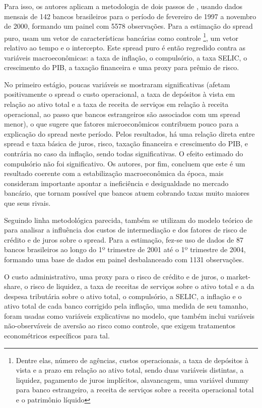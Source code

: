 \documentclass[a4paper, 12pt, openany, oneside, brazil]{abntex2}
\begin{document}
    Para isso, os autores aplicam a metodologia de dois passos de
    , usando dados mensais de 142 bancos brasileiros
    para o período de fevereiro de 1997 a novembro de 2000, formando um painel
    com 5578 observações. Para a estimação do spread puro, usam um vetor de
    características bancárias como controle \footnote{Dentre elas, número de
        agências, custos operacionais, a taxa de depósitos à vista e a prazo em
        relação ao ativo total, sendo duas variáveis distintas, a liquidez,
        pagamento de juros implícitos, alavancagem, uma variável dummy para banco
        estrangeiro, a receita de serviços sobre a receita operacional total e o
    patrimônio líquido}, um vetor relativo ao tempo e o intercepto. Este spread
    puro é então regredido contra as variáveis macroeconômicas: a taxa de
    inflação, o compulsório, a taxa SELIC, o crescimento do PIB, a taxação
    financeira e uma proxy para prêmio de risco.

    No primeiro estágio, poucas variáveis se mostraram significativas (afetam
    positivamente o spread o custo operacional, a taxa de depósitos à vista em
    relação ao ativo total e a taxa de receita de serviços em relação à receita
    operacional, ao passo que bancos estrangeiros são associados com um spread
    menor), o que sugere que fatores microeconômicos contribuem pouco para a
    explicação do spread neste período. Pelos resultados, há uma relação direta
    entre spread e taxa básica de juros, risco, taxação financeira e crescimento
    do PIB, e contrária no caso da inflação, sendo todas significativas. O
    efeito estimado do compulsório não foi significativo. Os autores, por fim,
    concluem que este é um resultado coerente com a estabilização macroeconômica
    da época, mais consideram importante apontar a ineficiência e desigualdade
    no mercado bancário, que tornam possível que bancos atuem cobrando taxas
    muito maiores que seus rivais.

    Seguindo linha metodológica parecida,  também se
    utilizam do modelo teórico de  para analisar a
    influência dos custos de intermediação e dos fatores de risco de crédito e
    de juros sobre o spread. Para a estimação, fez-se uso de dados de 87 bancos
    brasileiros ao longo do 1º trimestre de 2001 até o 1º trimestre de 2004,
    formando uma base de dados em painel desbalanceado com 1131 observações.
    
    O custo administrativo, uma proxy para o risco de crédito e de juros, o
    market-share, o risco de liquidez, a taxa de receitas de serviços sobre o
    ativo total e a da despesa tributária sobre o ativo total, o compulsório, a
    SELIC, a inflação e o ativo total de cada banco corrigido pela inflação, uma
    medida de seu tamanho, foram usadas como variáveis explicativas no modelo,
    que também inclui variáveis não-observáveis de aversão ao risco como
    controle, que exigem tratamentos econométricos específicos para tal. 
    
\end{document}
